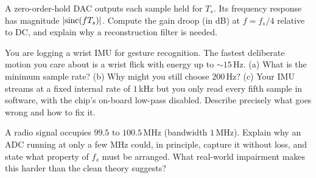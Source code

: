 \begin{exercise}
A zero-order-hold DAC outputs each sample held for $T_s$. Its frequency response has
magnitude $\lvert\operatorname{sinc}(f T_s)\rvert$. Compute the gain droop (in dB) at $f = f_s/4$ relative
to DC, and explain why a reconstruction filter is needed.
\end{exercise}

\begin{exercise}
You are logging a wrist IMU for gesture recognition. The fastest deliberate motion you
care about is a wrist flick with energy up to $\sim 15$\,Hz. (a) What is the minimum
sample rate? (b) Why might you still choose $200$\,Hz? (c) Your IMU streams at a fixed
internal rate of $1$\,kHz but you only read every fifth sample in software, with the
chip's on-board low-pass disabled. Describe precisely what goes wrong and how to fix it.
\end{exercise}

\begin{exercise}
A radio signal occupies $99.5$ to $100.5$\,MHz (bandwidth $1$\,MHz). Explain why an ADC
running at only a few MHz could, in principle, capture it without loss, and state what
property of $f_s$ must be arranged. What real-world impairment makes this harder than
the clean theory suggests?
\end{exercise}
